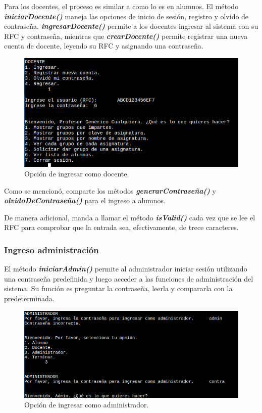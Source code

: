 \documentclass[a4paper,12pt]{article}
\begin{document}
Para los docentes, el proceso es similar a como lo es en alumnos. El método \textbf{\textit{iniciarDocente()}} maneja las opciones de inicio de sesión, registro y olvido de contraseña. \textbf{\textit{ingresarDocente()}} permite a los docentes ingresar al sistema con su RFC y contraseña, mientras que \textbf{\textit{crearDocente()}} permite registrar una nueva cuenta de docente, leyendo su RFC y asignando una contraseña.

\begin{figure}[ht]
    \centering
    \includegraphics[width=.9\textwidth]{media/ingreso_docente.png}
    \caption{Opción de ingresar como docente.}
    \label{fig:ingresodoc}
\end{figure}

Como se mencionó, comparte los métodos \textbf{\textit{generarContraseña()}} y \textbf{\textit{olvidoDeContraseña()}} para el ingreso a alumnos.

De manera adicional, manda a llamar el método \textbf{\textit{isValid()}} cada vez que se lee el RFC para comprobar que la entrada sea, efectivamente, de trece caracteres.

\subsubsection{Ingreso administración}

El método \textbf{\textit{iniciarAdmin()}} permite al administrador iniciar sesión utilizando una contraseña predefinida y luego acceder a las funciones de administración del sistema. Su función es preguntar la contraseña, leerla y compararla con la predeterminada.

\begin{figure}[ht]
    \centering
    \includegraphics[width=.9\textwidth]{media/ingreso_admin.png}
    \caption{Opción de ingresar como administrador.}
    \label{fig:ingresoadm}
\end{figure}
\end{document}
